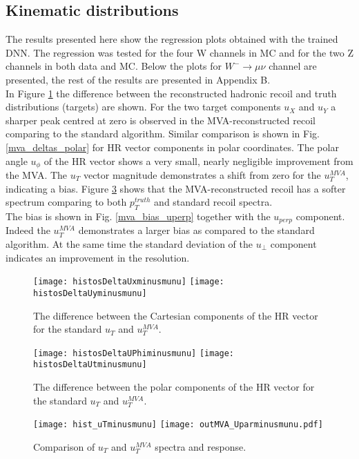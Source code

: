 \subsection{Kinematic distributions} 
The results presented here show the regression plots obtained with the trained DNN. The regression was tested for the four W channels in MC and for the two Z channels in both data and MC. Below the plots for $W^-\rightarrow \mu \nu$ channel are presented, the rest of the results are presented in Appendix B.\\
In Figure \ref{fig:mva_deltas} the difference between the reconstructed hadronic recoil and truth distributions (targets) are shown. For the two target components $u_X$ and $u_Y$ a sharper peak centred at zero is observed in the MVA-reconstructed recoil comparing to the standard algorithm. Similar comparison is shown in Fig. \ref{mva_deltas_polar} for HR vector components in polar coordinates. The polar angle $u_{\phi}$ of the HR vector shows a very small, nearly negligible improvement from the MVA. The $u_T$ vector magnitude demonstrates a shift from zero for the $u_T^{MVA}$, indicating a bias. Figure \ref{fig:mva_upar_pT} shows that the MVA-reconstructed recoil has a softer spectrum comparing to both $p_T^{truth}$ and standard recoil spectra.\\
The bias is shown in Fig. \ref{mva_bias_uperp} together with the $u_{perp}$ component. Indeed the $u_T^{MVA}$ demonstrates a larger bias as compared to the standard algorithm. At the same time the standard deviation of the $u_{\perp}$ component indicates an improvement in the resolution.\\
	\begin{figure}[tph]
	\centering
	\texttt{[image: histosDeltaUxminusmunu]}%
	\texttt{[image: histosDeltaUyminusmunu]}
	\caption{The difference between the Cartesian components of the HR vector for the standard $u_T$ and $u_T^{MVA}$.}
	\label{fig:mva_deltas}
\end{figure}
	\begin{figure}[tph]
	\centering
	\texttt{[image: histosDeltaUPhiminusmunu]}%
	\texttt{[image: histosDeltaUtminusmunu]}
	\caption{The difference between the polar components of the HR vector for the standard $u_T$ and $u_T^{MVA}$.}
	\label{fig:mva_deltas_polar}
\end{figure}
	\begin{figure}[tph]
	\centering
	\texttt{[image: hist\_uTminusmunu]}%
	\texttt{[image: outMVA\_Uparminusmunu.pdf]}
	\caption{Comparison of $u_T$ and $u_T^{MVA}$ spectra and response.}
	\label{fig:mva_upar_pT}
\end{figure}
